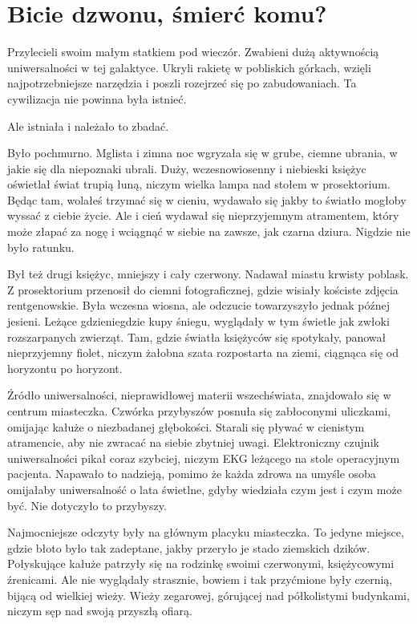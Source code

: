 \chapter{Bicie dzwonu, śmierć komu?}


Przylecieli swoim małym statkiem pod wieczór.
Zwabieni dużą aktywnością uniwersalności w tej galaktyce.
Ukryli rakietę w pobliskich górkach, wzięli najpotrzebniejsze narzędzia i poszli rozejrzeć się po zabudowaniach.
Ta cywilizacja nie powinna była istnieć.

Ale istniała i należało to zbadać.

Było pochmurno.
Mglista i zimna noc wgryzała się w grube, ciemne ubrania, w jakie się dla niepoznaki ubrali.
Duży, wczesnowiosenny i niebieski księżyc oświetlał świat trupią łuną, niczym wielka lampa nad stołem w prosektorium.
Będąc tam, wolałeś trzymać się w cieniu, wydawało się jakby to światło mogłoby wyssać z ciebie życie.
Ale i cień wydawał się nieprzyjemnym atramentem, który może złapać za nogę i wciągnąć w siebie na zawsze, jak czarna dziura. Nigdzie nie było ratunku.

Był też drugi księżyc, mniejszy i cały czerwony.
Nadawał miastu krwisty poblask. 
Z prosektorium przenosił do ciemni fotograficznej, gdzie wisiały kościste zdjęcia rentgenowskie.
Była wczesna wiosna, ale odczucie towarzyszyło jednak późnej jesieni.
Leżące gdzieniegdzie kupy śniegu, wyglądały w tym świetle jak zwłoki rozszarpanych zwierząt.
Tam, gdzie światła księżyców się spotykały, panował nieprzyjemny fiolet, niczym żałobna szata rozpostarta na ziemi, ciągnąca się od horyzontu po horyzont.

Źródło uniwersalności, nieprawidłowej materii wszechświata, znajdowało się w centrum miasteczka.
Czwórka przybyszów posnuła się zabłoconymi uliczkami, omijając kałuże o niezbadanej głębokości.
Starali się pływać w cienistym atramencie, aby nie zwracać na siebie zbytniej uwagi.
Elektroniczny czujnik uniwersalności pikał coraz szybciej, niczym EKG leżącego na stole operacyjnym pacjenta.
Napawało to nadzieją, pomimo że każda zdrowa na umyśle osoba omijałaby uniwersalność o lata świetlne, gdyby wiedziała czym jest i czym może być.
Nie dotyczyło to przybyszy.

Najmocniejsze odczyty były na głównym placyku miasteczka.
To jedyne miejsce, gdzie błoto było tak zadeptane, jakby przeryło je stado ziemskich dzików.
Połyskujące kałuże patrzyły się na rodzinkę swoimi czerwonymi, księżycowymi źrenicami.
Ale nie wyglądały strasznie, bowiem i tak przyćmione były czernią, bijącą od wielkiej wieży.
Wieży zegarowej, górującej nad półkolistymi budynkami, niczym sęp nad swoją przyszłą ofiarą.

